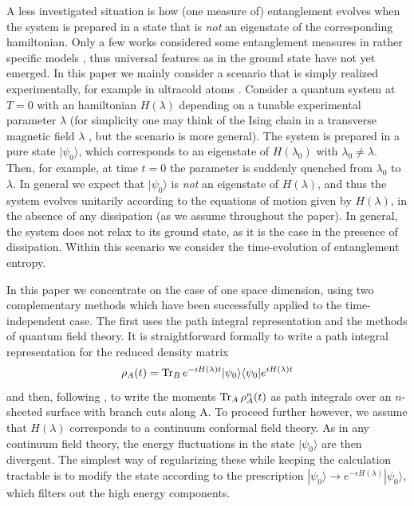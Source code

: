 \documentclass[12pt,preprint,tighten,eqsecnum,aps,floats,psfig,epsfig,amsmath,onecolumn]{revtex4-1}
\def\e{\epsilon}
\begin{document}
A less investigated situation is how (one measure of) entanglement evolves 
when the system is prepared in a state that is {\em not} an eigenstate of 
the corresponding hamiltonian.
Only a few works considered some entanglement measures in rather specific 
models \cite{outeq,dur}, thus universal features as in the ground state have 
not yet emerged. 
In this paper we mainly consider a scenario that is simply
realized experimentally, for example in ultracold atoms \cite{uc,sps-04}. 
Consider a quantum system at $T=0$ with an hamiltonian $H(\lambda)$ depending 
on a tunable experimental parameter $\lambda$ (for simplicity one may
think of the Ising chain in a transverse magnetic 
field $\lambda$ \cite{sach}, but the scenario is more general).
The system is prepared in a pure state $|\psi_0\rangle$,
which corresponds to an eigenstate of $H(\lambda_0)$ with 
$\lambda_0\neq \lambda$. Then, for example,
at time $t=0$ the parameter is suddenly quenched from 
$\lambda_0$ to $\lambda$. In general we expect that $|\psi_0\rangle$ 
is {\it not} an eigenstate of $H(\lambda)$, and thus the system evolves 
unitarily according to the equations of motion given by $H(\lambda)$, 
in the absence of any dissipation (as we assume throughout  the paper). 
In general, the system does not relax to its ground state,
as it is the case in the presence of dissipation.
Within this scenario we consider the time-evolution of 
entanglement entropy.




In this paper we concentrate on the case of one space dimension, using
two complementary methods which have been successfully applied to the
time-independent case. The first uses the path integral representation
and the methods of quantum field theory. It is straightforward formally to
write a path integral representation for the reduced density matrix
\begin{equation}
\rho_A(t)=
{\rm
Tr}_B\,e^{-iH(\lambda)t}|\psi_0\rangle\langle\psi_0|e^{iH(\lambda)t}
\end{equation}
and then, following \cite{cc-04}, to write the moments 
${\rm Tr}_A\,\rho_A^n(t)$ as path integrals over an $n$-sheeted surface with
branch cuts along A. To proceed further however, we assume that
$H(\lambda)$ corresponds to a continuum conformal field theory. As in
any continuum field theory, the energy fluctuations in the state
$|\psi_0\rangle$ are then divergent. The simplest way of regularizing
these while keeping the calculation tractable is to modify the state
according to the prescription
$|\psi_0\rangle\to e^{-\e H(\lambda)}|\psi_0\rangle$, which
filters out the high energy components. 
\end{document}

